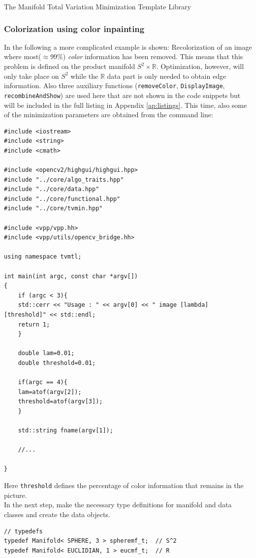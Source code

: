 \begin{chapter}{The Manifold Total Variation Minimization Template Library}
\subsubsection{Colorization using color inpainting} %
\label{ssub:Color inpainting}
In the following a more complicated example is shown: Recolorization of an image where most($\approx$99\%) \textit{color} information has been removed. This means that this
problem is defined on the product manifold $S^2\times \mathbb{R}$. Optimization, however, will only take place on $S^2$ while the $\mathbb{R}$ data part is only needed to obtain
edge information. Also three auxiliary functions (\texttt{removeColor}, \texttt{DisplayImage}, \texttt{recombineAndShow}) are used here that are not shown in the code snippets but
will be included in the full listing in Appendix \ref{ap:listings}. This time, also some of the minimization parameters 
are obtained from the command line:\\

\cppinline
\begin{lstlisting}[label=code:tut2_init,caption={Include library files and read parameters from standard input}]
#include <iostream>
#include <string>
#include <cmath>

#include <opencv2/highgui/highgui.hpp>
#include "../core/algo_traits.hpp"
#include "../core/data.hpp"
#include "../core/functional.hpp"
#include "../core/tvmin.hpp"

#include <vpp/vpp.hh>
#include <vpp/utils/opencv_bridge.hh>

using namespace tvmtl;

int main(int argc, const char *argv[])
{
    if (argc < 3){
	std::cerr << "Usage : " << argv[0] << " image [lambda] [threshold]" << std::endl;
	return 1;
    }

    double lam=0.01;
    double threshold=0.01;

    if(argc == 4){
	lam=atof(argv[2]);
	threshold=atof(argv[3]);
    }   

    std::string fname(argv[1]);

    //...

}
\end{lstlisting}
Here \texttt{threshold} defines the percentage of color information that remains in the picture.\\
In the next step, make the necessary type definitions for manifold and data classes and create the data objects.

\cppinline
\begin{lstlisting}[label=code:tut2_mfdata,caption={Manifold and Data class type definitions and instantiation}]
// typedefs
typedef Manifold< SPHERE, 3 > spheremf_t;  // S^2
typedef Manifold< EUCLIDIAN, 1 > eucmf_t;  // R
 

\end{lstlisting}
\end{chapter}
